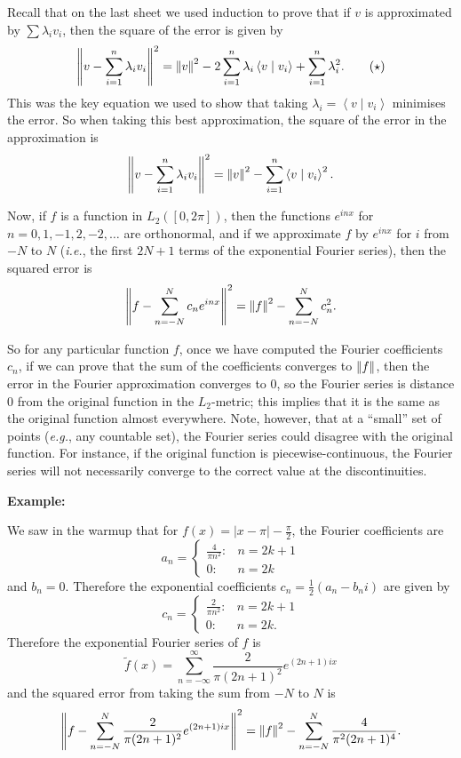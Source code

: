 \documentclass{article}
\newcommand{\norm}[1]{\left|\kern-1pt\left|#1\right|\kern-1pt\right|}
\newcommand{\braket}[2]{\left\langle #1 \mid #2 \right\rangle}
\begin{document}
Recall that on the last sheet we used induction to prove that if $v$ is approximated by $\sum \lambda_iv_i$, then the square of the error is given by
\begin{equation}
	\norm{v-\sum_{i=1}^n \lambda_iv_i}^2=\norm{v}^2 - 2 \sum_{i=1}^n \lambda_i\braket{v}{v_i} + \sum_{i=1}^n \lambda_i^2 .\tag{$\star$}
\end{equation}
This was the key equation we used to show that taking $\lambda_i=\braket{v}{v_i}$ minimises the error. So when taking this best approximation, the square of the error in the approximation is
\[\norm{v-\sum_{i=1}^n \lambda_iv_i}^2=\norm{v}^2 - \sum_{i=1}^n \braket{v}{v_i}^2.\]

Now, if $f$ is a function in $L_2([0,2\pi])$, then the functions $e^{inx}$ for $n=0,1,-1,2,-2,\hdots$ are orthonormal, and if we approximate $f$ by $e^{inx}$ for $i$ from $-N$ to $N$ (\textit{i.e.}, the first $2N+1$ terms of the exponential Fourier series), then the squared error is
\[\norm{f-\sum_{n=-N}^N c_n e^{inx}}^2=\norm{f}^2 - \sum_{n=-N}^N c_n^2.\]

So for any particular function $f$, once we have computed the Fourier coefficients $c_n$, if we can prove that the sum of the coefficients converges to $\norm{f}$, then the error in the Fourier approximation converges to 0, so the Fourier series is distance 0 from the original function in the $L_2$-metric; this implies that it is the same as the original function almost everywhere. Note, however, that at a ``small'' set of points (\textit{e.g.}, any countable set), the Fourier series could disagree with the original function. For instance, if the original function is piecewise-continuous, the Fourier series will not necessarily converge to the correct value at the discontinuities.

\clearpage


\textbf{Example:}\bigskip


We saw in the warmup that for $f(x)=|x-\pi|-\frac{\pi}{2}$, the Fourier coefficients are
\[a_n=\begin{cases} \frac{4}{\pi n^2}:&n=2k+1\\ 0: & n=2k\end{cases}\]
and $b_n=0$. Therefore the exponential coefficients $c_n=\frac{1}{2}(a_n-b_ni)$ are given by
\[c_n=\begin{cases} \frac{2}{\pi n^2}:& n=2k+1\\ 0: & n=2k.\end{cases}\]
Therefore the exponential Fourier series of $f$ is
\[\tilde{f}(x)=\sum_{n=-\infty}^{\infty} \frac{2}{\pi (2n+1)^2}e^{(2n+1)ix}\]
and the squared error from taking the sum from $-N$ to $N$ is
\[\norm{f-\sum_{n=-N}^N \frac{2}{\pi (2n+1)^2}e^{(2n+1)ix}}^2=\norm{f}^2-\sum_{n=-N}^N \frac{4}{\pi^2 (2n+1)^4}.\]
\end{document}
